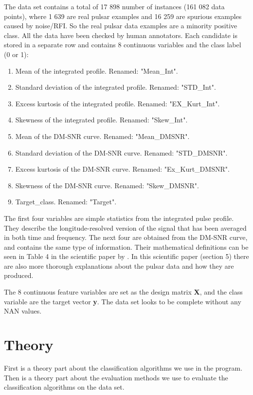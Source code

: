 \documentclass[12pt,a4paper,english]{article}
\begin{document}
The data set contains a total of 17 898 number of instances (161 082 data points), where 1 639 are real pulsar examples and 16 259 are spurious examples caused by noise/RFI. So the real pulsar data examples are a minority positive class. All the data have been checked by human annotators. Each candidate is stored in a separate row and contains 8 continuous variables and the class label (0 or 1):
\begin{enumerate}
	\item Mean of the integrated profile. Renamed: "Mean\_Int".
	\item Standard deviation of the integrated profile. Renamed: "STD\_Int".
	\item Excess kurtosis of the integrated profile. Renamed: "EX\_Kurt\_Int".
	\item Skewness of the integrated profile. Renamed: "Skew\_Int".
	\item Mean of the DM-SNR curve. Renamed: "Mean\_DMSNR".
	\item Standard deviation of the DM-SNR curve. Renamed: "STD\_DMSNR".
	\item Excess kurtosis of the DM-SNR curve. Renamed: "Ex\_Kurt\_DMSNR".
	\item Skewness of the DM-SNR curve. Renamed: "Skew\_DMSNR".
	\item Target\_class. Renamed: "Target".
\end{enumerate}
The first four variables are simple statistics from the integrated pulse profile. They describe the longitude-resolved version of the signal that has been averaged in both time and frequency. The next four are obtained from the DM-SNR curve, and contains the same type of information. Their mathematical definitions can be seen in Table 4 in the scientific paper by \citet{pulsar_art}. In this scientific paper (section 5) there are also more thorough explanations about the pulsar data and how they are produced.

The 8 continuous feature variables are set as the design matrix \textbf{X}, and the class variable are the target vector \textbf{y}. The data set looks to be complete without any NAN values.

\section{Theory}
\label{sect:Theory}
First is a theory part about the classification algorithms we use in the program. Then is a theory part about the evaluation methods we use to evaluate the classification algorithms on the data set.
\end{document}
